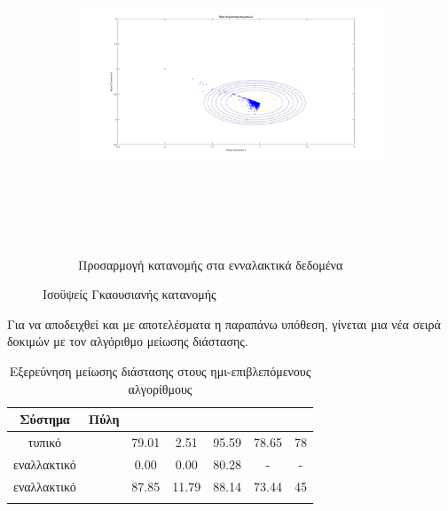 \begin{figure}[ht!]
\begin{subfigure}[b]{0.8\textwidth}
\includegraphics[width=160mm, height=100mm]{../../plots/gr_threshold_semi_sup_2.png}
\caption{Προσαρμογή κατανομής στα ενναλακτικά δεδομένα}
\label{fig:threshanomalydetection2}
\end{subfigure}

\caption{Ισοϋψείς Γκαουσιανής κατανομής}
\label{fig:viewandthreshold}
\end{figure}
\newpage
Για να αποδειχθεί και με αποτελέσματα η παραπάνω υπόθεση, γίνεται μια νέα σειρά δοκιμών με τον αλγόριθμο μείωσης διάστασης.
\begin{center}
\begin{longtabu} to 0.8\textwidth {| c | c || c | c | c | c | c |   }
 \hline
 Σύστημα & Πύλη &  &  &  &  & \\
\hline
τυπικό& & 79.01 & 2.51 & 95.59 & 78.65 & 78\\
 \hline
 εναλλακτικό& & 0.00 & 0.00  & 80.28 &  - &  -\\ 
\hline
εναλλακτικό& & 87.85 & 11.79  & 88.14 & 73.44 & 45\\ 
 \hline
\caption{Εξερεύνηση μείωσης διάστασης στους ημι-επιβλεπόμενους αλγορίθμους}
\label{tab:testpcasemisup}
\end{longtabu}
\end{center}

